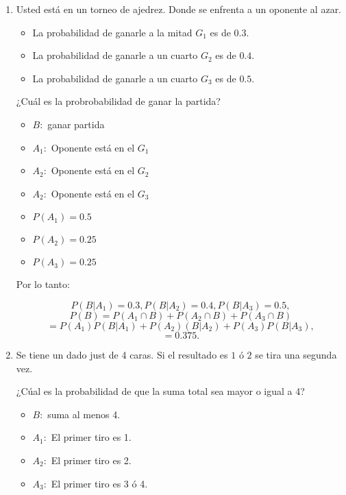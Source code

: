 \documentclass[a4paper]{book}
\begin{document}
\begin{enumerate}[{Ej.1) }]
    \item Usted está en un torneo de ajedrez. Donde se enfrenta a un oponente al azar.
        \begin{itemize}
            \item La probabilidad de ganarle a la mitad \(G_1\) es de \(0.3\).
            \item La probabilidad de ganarle a un cuarto \(G_2\) es de \(0.4\).
            \item La probabilidad de ganarle a un cuarto \(G_3\) es de \(0.5\).
        \end{itemize}

        ¿Cuál es la probrobabilidad de ganar la partida?

        \begin{itemize}
            \item \(B:\) ganar partida
            \item \(A_1:\) Oponente está en el  \(G_1\)
            \item \(A_2:\) Oponente está en el  \(G_2\)
            \item \(A_2:\) Oponente está en el  \(G_3\)
        \end{itemize}
        \begin{itemize}
            \item \(P\left(A_1\right)=0.5\)
            \item \(P\left(A_2\right)=0.25\)
            \item \(P\left(A_3\right)=0.25\)
        \end{itemize}

        Por lo tanto:

        \[
            P\left(B|A_1\right) = 0.3,P\left(B|A_2\right) =0.4,P\left(B|A_3 \right) =0.5
        ,\]
        \[
            P\left(B\right) = P\left(A_1\cap B\right)+P\left(A_2\cap B\right)+P\left(A_3\cap B\right)
        \]
        \[
            =P\left(A_1\right)P\left(B|A_1\right)+P\left(A_2\right)\left(B|A_2\right)+P\left(A_3\right)P\left(B|A_3\right)
        ,\]
        \[
        =0.375
        .\]

    \item Se tiene un dado just de 4 caras. Si el resultado es \(1\) ó \(2\) se
        tira una segunda vez.

        ¿Cúal es la probabilidad de que la suma total sea mayor o igual a 4?

        \begin{itemize}
            \item \(B:\) suma al menos 4.
            \item \(A_1:\) El primer tiro es 1.
            \item \(A_2:\) El primer tiro es 2.
            \item \(A_3:\) El primer tiro es 3 ó 4.
        \end{itemize}


\end{enumerate}
\end{document}
